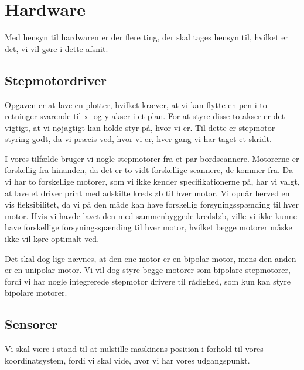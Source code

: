 \chapter[Design af hardware]{Hardware}
\label{ch:d-hardware}


Med hensyn til hardwaren er der flere ting, der skal tages hensyn
til, hvilket er det, vi vil gøre i dette afsnit.

\section{Stepmotordriver}

Opgaven er at lave en plotter, hvilket kræver, at vi kan flytte en pen
i to retninger svarende til x- og y-akser i et plan. For at styre
disse to akser er det vigtigt, at vi nøjagtigt kan holde styr på, hvor vi
er. Til dette er stepmotor styring godt, da vi præcis ved, hvor vi er,
hver gang vi har taget et skridt.

I vores tilfælde bruger vi nogle stepmotorer fra et par
bordscannere. Motorerne er forskellig fra hinanden, da det er to vidt
forskellige scannere, de kommer fra. Da vi har to forskellige motorer,
som vi ikke kender specifikationerne på, har vi valgt, at lave et
driver print med adskilte kredsløb til hver motor. Vi opnår herved en
vis fleksibilitet, da vi på den måde kan have forskellig
forsyningsspænding til hver motor. Hvis vi havde lavet den med
sammenbyggede kredsløb, ville vi ikke kunne have forskellige
forsyningsspænding til hver motor, hvilket begge motorer måske ikke
vil køre optimalt ved.

Det skal dog lige nævnes, at den ene motor er en bipolar motor, mens
den anden er en unipolar motor. Vi vil dog styre begge motorer som
bipolare stepmotorer, fordi vi har nogle integrerede stepmotor
drivere til rådighed, som kun kan styre bipolare motorer.


\section{Sensorer}
\label{sc:sensorer}

Vi skal være i stand til at nulstille maskinens position i forhold til
vores koordinatsystem, fordi vi skal vide, hvor vi har vores
udgangspunkt.

